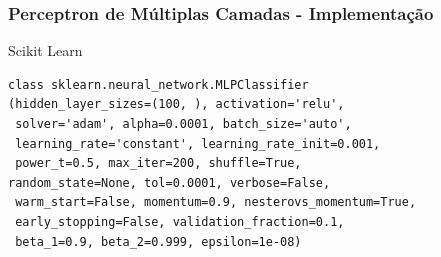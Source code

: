 \documentclass{beamer}
\begin{document}
\begin{frame}[fragile] %
\frametitle{Perceptron de Múltiplas Camadas - Implementação}
\begin{block}{Scikit Learn}
\begin{verbatim}
class sklearn.neural_network.MLPClassifier
(hidden_layer_sizes=(100, ), activation='relu',
 solver='adam', alpha=0.0001, batch_size='auto',
 learning_rate='constant', learning_rate_init=0.001,
 power_t=0.5, max_iter=200, shuffle=True, 
random_state=None, tol=0.0001, verbose=False,
 warm_start=False, momentum=0.9, nesterovs_momentum=True,
 early_stopping=False, validation_fraction=0.1,
 beta_1=0.9, beta_2=0.999, epsilon=1e-08)
\end{verbatim}
\end{block}

\end{frame}
\end{document}
